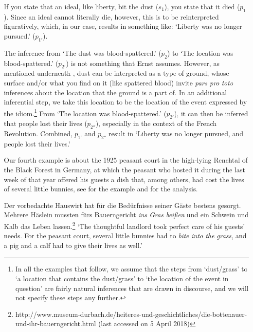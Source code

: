 \documentclass[output=paper]{langsci/langscibook}
\begin{document}
\noindent If you state that an ideal, like liberty, bit the dust ($s_{1}$), you state that it died ($p_{1}$). Since an ideal cannot literally die, however, this is to be reinterpreted figuratively, which, in our case, results in something like: `Liberty was no longer pursued.' ($p_{1'}$). 

The inference from `The dust was blood-spattered.' ($p_{2}$) to `The location was blood-spattered.' ($p_{2'}$) is not something that Ernst assumes. However, as mentioned underneath , dust can be interpreted as a type of ground, whose surface and/or what you find on it (like spattered blood) invite \textit{pars pro toto} inferences about the location that the ground is a part of. In an additional inferential step, we take this location to be the location of the event expressed by the idiom.\footnote{In all the examples that follow, we assume that the steps from `dust/grass' to `a location that contains the dust/grass' to `the location of the event in question' are fairly natural inferences that are drawn in discourse, and we will not specify these steps any further.\label{inferential steps}}
From `The location was blood-spattered.' ($p_{2'}$), it can then be inferred that people lost their lives ($p_{2''}$), especially in the context of the French Revolution. Combined, $p_{1'}$ and $p_{2''}$ result in `Liberty was no longer pursued, and people lost their lives.'

Our fourth example is about the 1925 peasant court in the high-lying Renchtal of the Black Forest in Germany, at which the peasant who hosted it during the last week of that year offered his guests a dish that, among others, had cost the lives of several little bunnies, see  for the example and  for the analysis.

\ea \label{snow-covered grass} 
Der vorbedachte Hauswirt hat für die Bedürfnisse seiner Gäste bestens gesorgt. Mehrere Häslein mussten fürs Bauerngericht \textit{ins} \underline{} \textit{Gras beißen} und ein Schwein und Kalb das Leben lassen.\footnote{http://www.museum-durbach.de/heiteres-und-geschichtliches/die-bottenauer-und-ihr-bauerngericht.html (last accessed on 5 April 2018)}
\vspace{5pt}
\glt `The thoughtful landlord took perfect care of his guests' needs. For the peasant court, several little bunnies had to \textit{bite into the} \underline{} \textit{grass}, and a pig and a calf had to give their lives as well.'
\z
\end{document}

